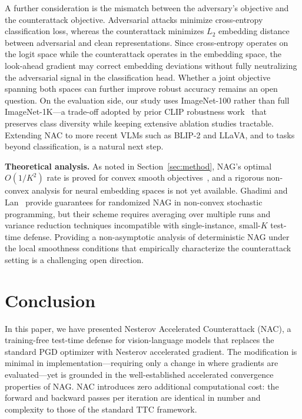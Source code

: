 \documentclass[12pt,a4paper]{article}
\begin{document}
A further consideration is the mismatch between the adversary's objective and the counterattack objective. Adversarial attacks minimize cross-entropy classification loss, whereas the counterattack minimizes $L_2$ embedding distance between adversarial and clean representations. Since cross-entropy operates on the logit space while the counterattack operates in the embedding space, the look-ahead gradient may correct embedding deviations without fully neutralizing the adversarial signal in the classification head. Whether a joint objective spanning both spaces can further improve robust accuracy remains an open question. On the evaluation side, our study uses ImageNet-100 rather than full ImageNet-1K---a trade-off adopted by prior CLIP robustness work~\cite{mao2023understanding,xing2025clip} that preserves class diversity while keeping extensive ablation studies tractable. Extending NAC to more recent VLMs such as BLIP-2 and LLaVA, and to tasks beyond classification, is a natural next step.

\textbf{Theoretical analysis.} As noted in Section~\ref{sec:method}, NAG's optimal $O(1/K^2)$ rate is proved for convex smooth objectives~\cite{nesterov1983method}, and a rigorous non-convex analysis for neural embedding spaces is not yet available. Ghadimi and Lan~\cite{ghadimi2016accelerated} provide guarantees for randomized NAG in non-convex stochastic programming, but their scheme requires averaging over multiple runs and variance reduction techniques incompatible with single-instance, small-$K$ test-time defense. Providing a non-asymptotic analysis of deterministic NAG under the local smoothness conditions that empirically characterize the counterattack setting is a challenging open direction.

\section{Conclusion}\label{sec:conclusion}

In this paper, we have presented Nesterov Accelerated Counterattack (NAC), a training-free test-time defense for vision-language models that replaces the standard PGD optimizer with Nesterov accelerated gradient. The modification is minimal in implementation---requiring only a change in where gradients are evaluated---yet is grounded in the well-established accelerated convergence properties of NAG. NAC introduces zero additional computational cost: the forward and backward passes per iteration are identical in number and complexity to those of the standard TTC framework.
\end{document}
